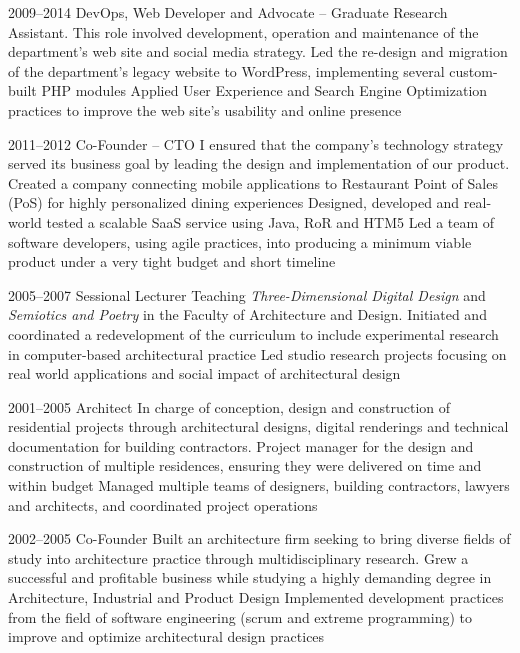 \documentclass[full]{rvca}
\begin{document}
{2009--2014}
{DevOps, Web Developer and Advocate -- Graduate Research Assistant.} %
{This role involved development, operation and maintenance of the department's web site and social media strategy.}
{Led the re-design and migration of the department's legacy website to WordPress, implementing several custom-built PHP modules}
{Applied User Experience and Search Engine Optimization practices to improve the web site's usability and online presence}
{}
{}

{2011--2012}
{Co-Founder -- CTO} %
{I ensured that the company's technology strategy served its business goal by leading the design and implementation of our product.} %
{Created a company connecting mobile applications to Restaurant Point of Sales (PoS) for highly personalized dining experiences}
{Designed, developed and real-world tested a scalable SaaS service using Java, RoR and HTM5}
{Led a team of software developers, using agile practices, into producing a minimum viable product under a very tight budget and short timeline}
{}
{}

{2005--2007}
{Sessional Lecturer} %
{Teaching \emph{Three-Dimensional Digital Design} and \emph{Semiotics and Poetry} in the Faculty of Architecture and Design.} %
{Initiated and coordinated a redevelopment of the curriculum to include experimental research in computer-based architectural practice}
{Led studio research projects focusing on real world applications and social impact of architectural design}
{}
{}
{}

{2001--2005}
{Architect} %
{In charge of conception, design and construction of residential projects through architectural designs, digital renderings and technical documentation for building contractors.} %
{Project manager for the design and construction of multiple residences, ensuring they were delivered on time and within budget}
{Managed multiple teams of designers, building contractors, lawyers and architects, and coordinated project operations}
{}
{}
{}

{2002--2005}
{Co-Founder} %
{Built an architecture firm seeking to bring diverse fields of study into architecture practice through multidisciplinary research.} %
{Grew a successful and profitable business while studying a highly demanding degree in Architecture, Industrial and Product Design}
{Implemented development practices from the field of software engineering (scrum and extreme programming) to improve and optimize architectural design practices}
{}
{}
{}
\end{document}
